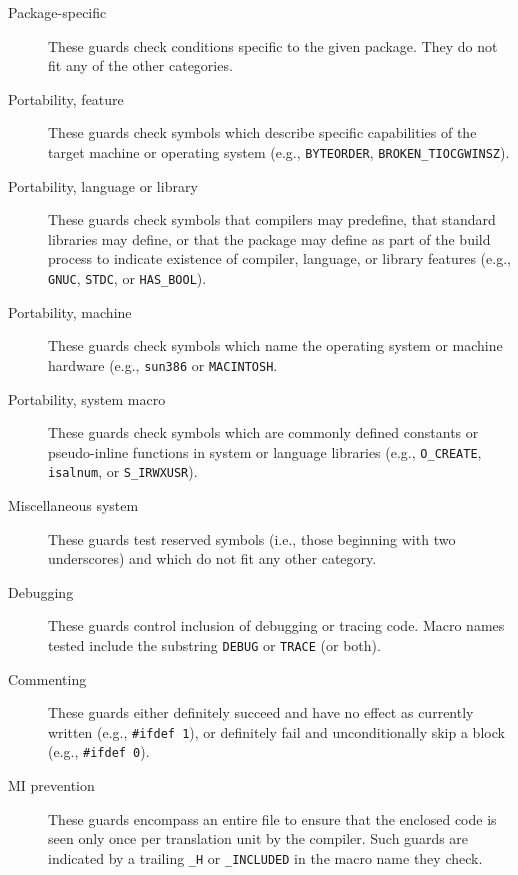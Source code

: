 \begin{description}

\item[Package-specific] These guards check conditions specific
      to the given package.  They do not fit any of the other categories.

\item[Portability, feature] These guards check symbols which
      describe specific capabilities of the target machine or operating
      system (e.g., \texttt{BYTEORDER}, \texttt{BROKEN_TIOCGWINSZ}).

\item[Portability, language or library] These guards check
      symbols that compilers may predefine, that standard libraries may
      define, or that the package may define as part of the build
      process to indicate existence of compiler, language, or library
      features (e.g., \texttt{GNUC}, \texttt{STDC}, or \texttt{HAS_BOOL}).

\item[Portability, machine] These guards check symbols which
      name the operating system or machine hardware (e.g.,
      \texttt{sun386} or \texttt{MACINTOSH}.
      
\item[Portability, system macro] These guards check symbols
      which are commonly defined constants or pseudo-inline functions in
      system or language libraries (e.g., \texttt{O_CREATE},
      \texttt{isalnum}, or \texttt{S_IRWXUSR}).

\item[Miscellaneous system] These guards test reserved symbols
      (i.e., those beginning with two underscores) and which do not
      fit any other category.
      
\item[Debugging] These guards control inclusion of debugging
      or tracing code.  Macro names tested include the
      substring \texttt{DEBUG} or \texttt{TRACE} (or both).
      
\item[Commenting] These guards either definitely succeed and
      have no effect as currently written (e.g., \texttt{#ifdef 1}), or
      definitely fail and unconditionally skip a block (e.g.,
      \texttt{#ifdef 0}).
      
\item[MI prevention] These guards encompass an entire file to
      ensure that the enclosed code is seen only once per translation
      unit by the compiler.  Such guards are indicated by a trailing
      \texttt{_H} or \texttt{_INCLUDED} in the macro name they check.


\end{description}
